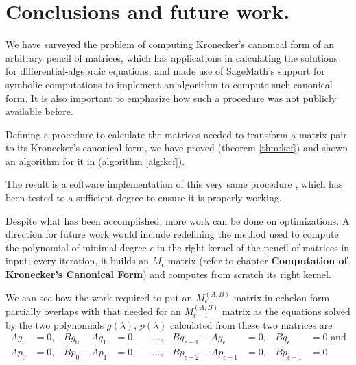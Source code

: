 \section{Conclusions and future work.}
We have surveyed the problem of computing Kronecker's canonical form of an arbitrary pencil of matrices, which has
applications in calculating the solutions for differential-algebraic equations, and made use of SageMath's \cite{sage}
support for symbolic computations to implement an algorithm to compute such canonical form. It is also important
to emphasize how such a procedure was not publicly available before.

Defining a procedure to calculate the matrices needed to transform a matrix pair to its Kronecker's canonical form,
we have proved  (theorem \ref{thm:kcf}) and shown an algorithm for it in 
(algorithm \ref{alg:kcf}).

The result is a software implementation of this very same procedure \cite{Trapani_Computation_of_Kronecker_s},
which has been tested to a sufficient degree to ensure it is properly working.

Despite what has been accomplished, more work can be done on optimizations. A direction for future work
would include redefining the method used to compute the polynomial of minimal degree \(\epsilon\) in the right kernel of
the pencil of matrices in input; every iteration, it builds an \(M_\epsilon\) matrix (refer to chapter
\textbf{Computation of Kronecker's Canonical Form}) and computes from scratch its right kernel.

We can see how the work required to put an \(M_{\epsilon}^{(A, B)}\) matrix in echelon form partially
overlaps with that needed for an \(M_{\epsilon-1}^{(A, B)}\) matrix as the equations solved by the two polynomials
\(g(\lambda)\), \(p(\lambda)\) calculated from these two matrices are
\begin{align*}
    Ag_{0} &= 0, &
    Bg_{0} - Ag_{1} &= 0, &
    & ..., &
    Bg_{\epsilon-1} - Ag_{\epsilon} &= 0, &
    Bg_{\epsilon} &= 0 \text{ and} \\
    Ap_{0} &= 0, &
    Bp_{0} - Ap_{1} &= 0, &
    & ..., &
    Bp_{\epsilon-2} - Ap_{\epsilon-1} &= 0, &
    Bp_{\epsilon-1} &= 0.
\end{align*}